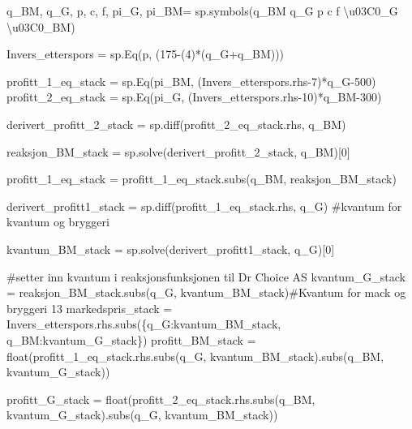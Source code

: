 \documentclass[
  12pt,
  a4paper,
  DIV=11,
  numbers=noendperiod]{scrartcl}
\newenvironment{Shaded}{\begin{snugshade}}{\end{snugshade}}
\newcommand{\BuiltInTok}[1]{\textcolor[rgb]{0.00,0.23,0.31}{#1}}
\newcommand{\CharTok}[1]{\textcolor[rgb]{0.13,0.47,0.30}{#1}}
\newcommand{\CommentTok}[1]{\textcolor[rgb]{0.37,0.37,0.37}{#1}}
\newcommand{\DecValTok}[1]{\textcolor[rgb]{0.68,0.00,0.00}{#1}}
\newcommand{\NormalTok}[1]{\textcolor[rgb]{0.00,0.23,0.31}{#1}}
\newcommand{\OperatorTok}[1]{\textcolor[rgb]{0.37,0.37,0.37}{#1}}
\newcommand{\StringTok}[1]{\textcolor[rgb]{0.13,0.47,0.30}{#1}}
\begin{document}
\begin{Shaded}
\begin{Highlighting}[]
\NormalTok{q\_BM, q\_G, p, c, f, pi\_G, pi\_BM}\OperatorTok{=}\NormalTok{ sp.symbols(}\StringTok{\textquotesingle{}q\_BM q\_G p c f }\CharTok{\textbackslash{}u03C0}\StringTok{\_G }\CharTok{\textbackslash{}u03C0}\StringTok{\_BM\textquotesingle{}}\NormalTok{)}

\NormalTok{Invers\_etterspors }\OperatorTok{=}\NormalTok{ sp.Eq(p, (}\DecValTok{175}\OperatorTok{{-}}\NormalTok{(}\DecValTok{4}\NormalTok{)}\OperatorTok{*}\NormalTok{(q\_G}\OperatorTok{+}\NormalTok{q\_BM)))}


\NormalTok{profitt\_1\_eq\_stack }\OperatorTok{=}\NormalTok{ sp.Eq(pi\_BM, (Invers\_etterspors.rhs}\OperatorTok{{-}}\DecValTok{7}\NormalTok{)}\OperatorTok{*}\NormalTok{q\_G}\OperatorTok{{-}}\DecValTok{500}\NormalTok{)}
\NormalTok{profitt\_2\_eq\_stack }\OperatorTok{=}\NormalTok{ sp.Eq(pi\_G, (Invers\_etterspors.rhs}\OperatorTok{{-}}\DecValTok{10}\NormalTok{)}\OperatorTok{*}\NormalTok{q\_BM}\OperatorTok{{-}}\DecValTok{300}\NormalTok{)}


\NormalTok{derivert\_profitt\_2\_stack }\OperatorTok{=}\NormalTok{ sp.diff(profitt\_2\_eq\_stack.rhs, q\_BM)}

\NormalTok{reaksjon\_BM\_stack }\OperatorTok{=}\NormalTok{ sp.solve(derivert\_profitt\_2\_stack, q\_BM)[}\DecValTok{0}\NormalTok{]}

\NormalTok{profitt\_1\_eq\_stack }\OperatorTok{=}\NormalTok{ profitt\_1\_eq\_stack.subs(q\_BM, reaksjon\_BM\_stack)}

\NormalTok{derivert\_profitt1\_stack }\OperatorTok{=}\NormalTok{ sp.diff(profitt\_1\_eq\_stack.rhs, q\_G) }\CommentTok{\#kvantum for kvantum og bryggeri}

\NormalTok{kvantum\_BM\_stack }\OperatorTok{=}\NormalTok{ sp.solve(derivert\_profitt1\_stack, q\_G)[}\DecValTok{0}\NormalTok{]}

\CommentTok{\#setter inn kvantum i reaksjonsfunksjonen til Dr Choice AS}
\NormalTok{kvantum\_G\_stack }\OperatorTok{=}\NormalTok{ reaksjon\_BM\_stack.subs(q\_G, kvantum\_BM\_stack)}\CommentTok{\#Kvantum for mack og bryggeri 13}
\NormalTok{markedspris\_stack }\OperatorTok{=}\NormalTok{ Invers\_etterspors.rhs.subs(\{q\_G:kvantum\_BM\_stack, q\_BM:kvantum\_G\_stack\})}
\NormalTok{profitt\_BM\_stack }\OperatorTok{=} \BuiltInTok{float}\NormalTok{(profitt\_1\_eq\_stack.rhs.subs(q\_G, kvantum\_BM\_stack).subs(q\_BM, kvantum\_G\_stack))}

\NormalTok{profitt\_G\_stack }\OperatorTok{=} \BuiltInTok{float}\NormalTok{(profitt\_2\_eq\_stack.rhs.subs(q\_BM, kvantum\_G\_stack).subs(q\_G, kvantum\_BM\_stack))}


\end{Highlighting}
\end{Shaded}
\end{document}
